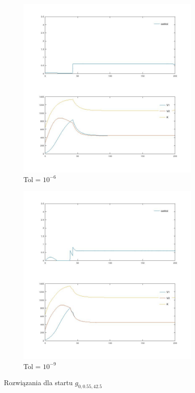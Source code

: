 \documentclass[11pt]{article}
\begin{document}
\begin{figure}[h!]
  \begin{subfigure}{.5\textwidth}
    \includegraphics[width=\textwidth]{../plots/p_55_6}
    \caption{Tol = $10^{-6}$}\label{p_55_6}
  \end{subfigure}
  \begin{subfigure}{.5\textwidth}
    \includegraphics[width=\textwidth]{../plots/p_55_9}
    \caption{Tol = $10^{-9}$}\label{p_55_9}
  \end{subfigure}%
  \caption{Rozwiązania dla startu $g_{0,0.55,42.5}$}\label{test_g55_sol}
\end{figure}
\end{document}
